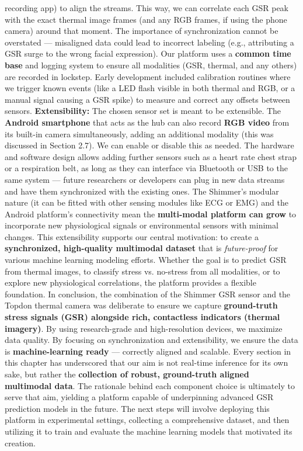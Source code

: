 recording app) to align the streams. This way, we can correlate each GSR peak with the exact thermal image frames (and any RGB frames, if using the phone camera) around that moment. The importance of synchronization cannot be overstated --- misaligned data could lead to incorrect labeling (e.g., attributing a GSR surge to the wrong facial expression). Our platform uses a \textbf{common time base} and logging system to ensure all modalities (GSR, thermal, and any others) are recorded in lockstep. Early development included calibration routines where we trigger known events (like a LED flash visible in both thermal and RGB, or a manual signal causing a GSR spike) to measure and correct any offsets between sensors. \textbf{Extensibility:} The chosen sensor set is meant to be extensible. The \textbf{Android smartphone} that acts as the hub can also record \textbf{RGB video} from its built-in camera simultaneously, adding an additional modality (this was discussed in Section 2.7). We can enable or disable this as needed. The hardware and software design allows adding further sensors such as a heart rate chest strap or a respiration belt, as long as they can interface via Bluetooth or USB to the same system --- future researchers or developers can plug in new data streams and have them synchronized with the existing ones. The Shimmer's modular nature (it can be fitted with other sensing modules like ECG or EMG) and the Android platform's connectivity mean the \textbf{multi-modal platform can grow} to incorporate new physiological signals or environmental sensors with minimal changes. This extensibility supports our central motivation: to create a \textbf{synchronized, high-quality multimodal dataset} that is \textit{future-proof} for various machine learning modeling efforts. Whether the goal is to predict GSR from thermal images, to classify stress vs. no-stress from all modalities, or to explore new physiological correlations, the platform provides a flexible foundation. In conclusion, the combination of the Shimmer GSR sensor and the Topdon thermal camera was deliberate to ensure we capture \textbf{ground-truth stress signals (GSR) alongside rich, contactless indicators (thermal imagery)}. By using research-grade and high-resolution devices, we maximize data quality. By focusing on synchronization and extensibility, we ensure the data is \textbf{machine-learning ready} --- correctly aligned and scalable. Every section in this chapter has underscored that our aim is not real-time inference for its own sake, but rather the \textbf{collection of robust, ground-truth aligned multimodal data}. The rationale behind each component choice is ultimately to serve that aim, yielding a platform capable of underpinning advanced GSR prediction models in the future. The next steps will involve deploying this platform in experimental settings, collecting a comprehensive dataset, and then utilizing it to train and evaluate the machine learning models that motivated its creation. 